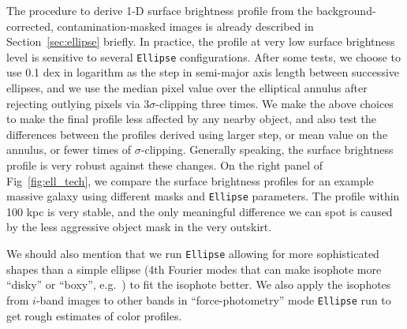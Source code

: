 \documentclass{emulateapj}
\begin{document}
\begin{CJK*}{UTF8}{gbsn}
    The procedure to derive 1-D surface brightness profile from the 
    background-corrected, contamination-masked images is already described in 
    Section~\ref{sec:ellipse} briefly. 
    In practice, the profile at very low surface brightness level is sensitive to 
    several \texttt{Ellipse} configurations.
    After some tests, we choose to use 0.1 dex in logarithm as the step in semi-major 
    axis length between successive ellipses, and we use the median pixel value over the
    elliptical annulus after rejecting outlying pixels via $3\sigma$-clipping three
    times.
    We make the above choices to make the final profile less affected by any nearby
    object, and also test the differences between the profiles derived using larger
    step, or mean value on the annulus, or fewer times of $\sigma$-clipping. 
    Generally speaking, the surface brightness profile is very robust against these
    changes.  
    On the right panel of Fig~\ref{fig:ell_tech}, we compare the surface brightness
    profiles for an example massive galaxy using different masks and \texttt{Ellipse}
    parameters. 
    The profile within 100 kpc is very stable, and the only meaningful difference 
    we can spot is caused by the less aggressive object mask in the very outskirt.    
    
    We should also mention that we run \texttt{Ellipse} allowing for more 
    sophisticated shapes than a simple ellipse (4th Fourier modes that can make 
    isophote more ``disky'' or ``boxy'', e.g.\ \citealt{Kormendy2009}) to fit the 
    isophote better.
    We also apply the isophotes from $i$-band images to other bands in 
    ``force-photometry'' mode \texttt{Ellipse} run to get rough estimates of 
    color profiles.  
    

\end{CJK*}
\end{document}
